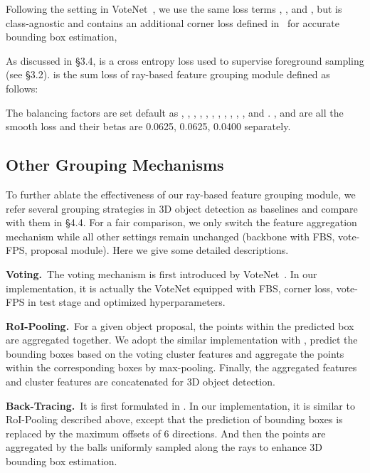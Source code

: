 \documentclass[final]{cvpr}
\begin{document}
Following the setting in VoteNet~\cite{qi2019deep}, we use the same loss terms , ,  and , but  is class-agnostic and contains an additional corner loss defined in~\cite{qi2018frustum} for accurate bounding box estimation,



As discussed in \S{\color{red}3.4},  is a cross entropy loss used to supervise foreground sampling (see \S{\color{red}3.2}). 
 is the sum loss of ray-based feature grouping module defined as follows:

\vspace{-10pt}

The balancing factors are set default as , , , , , , , , , , ,  and . 
,  and  are all the smooth  loss and their betas are 0.0625, 0.0625, 0.0400 separately.

\subsection{Other Grouping Mechanisms}
To further ablate the effectiveness of our ray-based feature grouping module, we refer several grouping strategies in 3D object detection as baselines and compare with them in \S{\color{red}4.4}. For a fair comparison, we only switch the feature aggregation mechanism while all other settings remain unchanged (\eg backbone with FBS, vote-FPS, proposal module). Here we give some detailed descriptions.

\noindent\textbf{Voting.}~The voting mechanism is first introduced by VoteNet~\cite{qi2019deep}. In our implementation, it is actually the VoteNet equipped with FBS, corner loss, vote-FPS in test stage and optimized hyperparameters.

\noindent\textbf{RoI-Pooling.}~For a given object proposal, the points within the predicted box are aggregated together. We adopt the similar implementation with \cite{cheng2021back}, predict the bounding boxes based on the voting cluster features and aggregate the points within the corresponding boxes by max-pooling. Finally, the aggregated features and cluster features are concatenated for 3D object detection. 

\noindent\textbf{Back-Tracing.}~It is first formulated in \cite{cheng2021back}. In our implementation, it is similar to RoI-Pooling described above, except that the prediction of bounding boxes is replaced by the maximum offsets of 6 directions. And then the points are aggregated by the balls uniformly sampled along the rays to enhance 3D bounding box estimation. 
\end{document}

